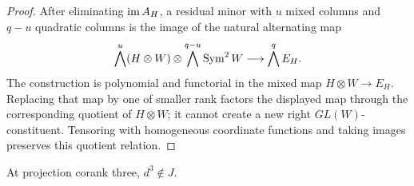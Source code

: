 \begin{proof}
After eliminating \(\operatorname{im} A_H\), a residual minor with \(u\)
mixed columns and \(q-u\) quadratic columns is the image of the
natural alternating map
\[
 \bigwedge^u(H\otimes W)\otimes
 \bigwedge^{q-u}\operatorname{Sym}^2W
 \longrightarrow \bigwedge^q E_H.
\]
The construction is polynomial and functorial in the mixed map
\(H\otimes W\to E_H\).  Replacing that map by one of smaller
rank factors the displayed map through the corresponding quotient of
\(H\otimes W\); it cannot create a new right
\(GL(W)\)-constituent.  Tensoring with homogeneous coordinate
functions and taking images preserves this quotient relation.
\end{proof}
\begin{lemma}
\label{lem:no-d3-corank3}
At projection corank three, \(d^3\notin J\).
\end{lemma}

